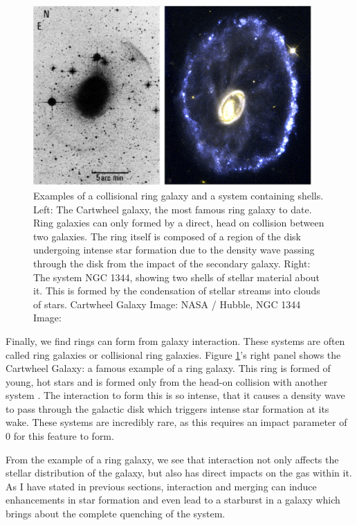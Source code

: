 \begin{figure}
    \centering
    \includegraphics[width=0.95\textwidth]{Introduction/figures/shells-rings.jpg}
    \caption{Examples of a collisional ring galaxy and a system containing shells. Left: The Cartwheel galaxy, the most famous ring galaxy to date. Ring galaxies can only formed by a direct, head on collision between two galaxies. The ring itself is composed of a region of the disk undergoing intense star formation due to the density wave passing through the disk from the impact of the secondary galaxy. Right: The system NGC 1344, showing two shells of stellar material about it. This is formed by the condensation of stellar streams into clouds of stars. Cartwheel Galaxy Image: NASA / Hubble, NGC 1344 Image: \citet{1983ApJ...274..534M}}
    \label{fig:tidal-features-ex}
\end{figure}

Finally, we find rings can form from galaxy interaction. These systems are often called ring galaxies or collisional ring galaxies. Figure \ref{fig:tidal-features-ex}'s right panel shows the Cartwheel Galaxy: a famous example of a ring galaxy. This ring is formed of young, hot stars and is formed only from the head-on collision with another system \citep{Lynds and Toomre 1976}. The interaction to form this is so intense, that it causes a density wave to pass through the galactic disk which triggers intense star formation at its wake. These systems are incredibly rare, as this requires an impact parameter of 0 for this feature to form.

From the example of a ring galaxy, we see that interaction not only affects the stellar distribution of the galaxy, but also has direct impacts on the gas within it. As I have stated in previous sections, interaction and merging can induce enhancements in star formation and even lead to a starburst in a galaxy which brings about the complete quenching of the system.

